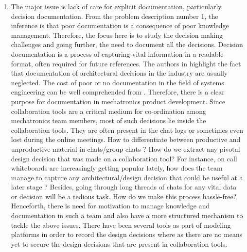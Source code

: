 \begin{enumerate}
\item The major issue is lack of care for explicit documentation, particularly decision documentation. From the problem description number 1, the inference is that poor documentation is a consequence of poor knowledge management. Therefore, the focus here is to study the decision making challenges\cite{hamida_towards_nodate} and going further, the need to document all the decisions. Decision documentation is a process of capturing vital information in a readable format, often required for future references. The authors in \cite{manteuffel_decision_2016} highlight the fact that documentation of architectural decisions in the industry are usually neglected. The cost of poor or no documentation in the field of systems engineering can be well comprehended from \cite{kasser_improving_1995}. Therefore, there is a clear purpose for documentation in mechatronics product development. Since collaboration tools are a critical medium for co-ordination among mechatronics team members, most of such decisions lie inside the collaboration tools. They are often present in the chat logs or sometimes even lost during the online meetings. How to differentiate between productive and unproductive material in chats/group chats \cite{zhang_making_2018}? How do we extract any pivotal design decision that was made on a collaboration tool? For instance, on call whiteboards are increasingly getting popular lately, how does the team manage to capture any architectural/design decision that could be useful at a later stage \cite{gilson2019natural}? Besides, going through long threads of chats for any vital data or decision will be a tedious task. How do we make this process hassle-free? Henceforth, there is need for motivation to manage knowledge and documentation in such a team and also have a more structured mechanism to tackle the above issues. There have been several tools as part of modeling platforms in order to record the design decisions\cite{manteuffel_decision_2016} where as there are no means yet to secure the design decisions that are present in collaboration tools.
\end{enumerate}

